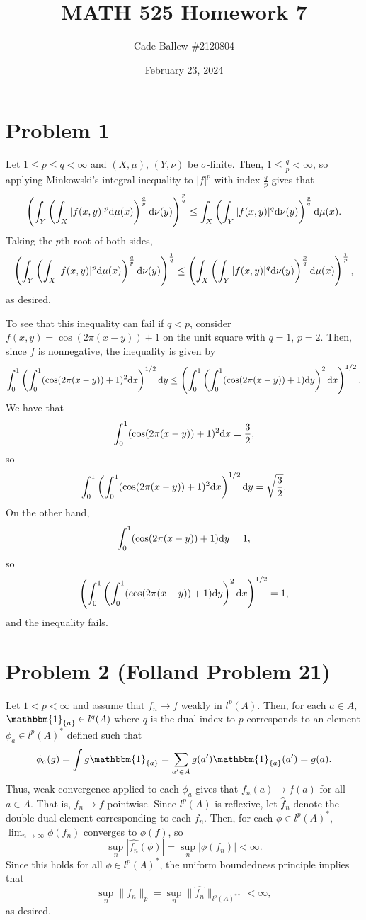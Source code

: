 \documentclass{article}
\title{MATH 525 Homework 7}
\author{Cade Ballew \#2120804}
\date{February 23, 2024}
\begin{document}
	
\maketitle
	
\section{Problem 1}
Let $1\leq p\leq q<\infty$ and $(X,\mu)$, $(Y,\nu)$ be $\sigma$-finite. Then, $1\leq \frac{q}{p}<\infty$, so applying Minkowski's integral inequality to $|f|^p$ with index $\frac{q}{p}$ gives that
\[
\left(\int_Y\left(\int_X|f(x, y)|^p \mathrm{d} \mu(x)\right)^{\frac{q}{p}} \mathrm{d} \nu(y)\right)^{\frac{p}{q}} \leq\int_X\left(\int_Y|f(x, y)|^q \mathrm{d} \nu(y)\right)^{\frac{p}{q}} \mathrm{d} \mu(x).
\]
Taking the $p$th root of both sides, 
$$
\left(\int_Y\left(\int_X|f(x, y)|^p \mathrm{d} \mu(x)\right)^{\frac{q}{p}} \mathrm{d} \nu(y)\right)^{\frac{1}{q}} \leq\left(\int_X\left(\int_Y|f(x, y)|^q \mathrm{d} \nu(y)\right)^{\frac{p}{q}} \mathrm{d} \mu(x)\right)^{\frac{1}{p}},
$$
as desired.

To see that this inequality can fail if $q<p$, consider $f(x,y)=\cos(2\pi(x-y))+1$ on the unit square with $q=1$, $p=2$. Then, since $f$ is nonnegative, the inequality is given by
\[
\int_0^1\left(\int_0^1(\cos(2\pi(x-y))+1)^2 \mathrm{d} x\right)^{1/2} \mathrm{d} y \leq\left(\int_0^1\left(\int_0^1(\cos(2\pi(x-y))+1) \mathrm{d} y\right)^{2} \mathrm{d} x\right)^{1/2}.
\]
We have that
\begin{align*}
\int_0^1(\cos(2\pi(x-y))+1)^2 \mathrm{d} x=\frac{3}{2},
\end{align*}
so
\[
\int_0^1\left(\int_0^1(\cos(2\pi(x-y))+1)^2 \mathrm{d} x\right)^{1/2} \mathrm{d} y=\sqrt{\frac{3}{2}}.
\]
On the other hand, 
\[
\int_0^1(\cos(2\pi(x-y))+1) \mathrm{d} y=1,
\]
so 
\[
\left(\int_0^1\left(\int_0^1(\cos(2\pi(x-y))+1) \mathrm{d} y\right)^{2} \mathrm{d} x\right)^{1/2}=1,
\]
and the inequality fails.

\section{Problem 2 (Folland Problem 21)}
Let $1<p<\infty$ and assume that $f_n\to f$ weakly in $l^p(A)$. Then, for each $a\in A$, $\mathbbm{1}_{\{a\}}\in l^q(A)$ where $q$ is the dual index to $p$ corresponds to an element $\phi_a\in l^p(A)^*$ defined such that
\[
\phi_a(g)=\int g\mathbbm{1}_{\{a\}}=\sum_{a'\in A}g(a')\mathbbm{1}_{\{a\}}(a')=g(a).
\]
Thus, weak convergence applied to each $\phi_a$ gives that $f_n(a)\to f(a)$ for all $a\in A$. That is, $f_n\to f$ pointwise. Since $l^p(A)$ is reflexive, let $\hat f_n$ denote the double dual element corresponding to each $f_n$. Then, for each $\phi\in l^p(A)^*$, $\lim_{n\to\infty}\phi(f_n)$ converges to $\phi(f)$, so
\[
\sup_n|\hat{f_n}(\phi)|=\sup_n|\phi(f_n)|<\infty.
\]
Since this holds for all $\phi\in l^p(A)^*$, the uniform boundedness principle implies that 
\[
\sup_n\|f_n\|_p=\sup_n\|\hat{f_n}\|_{l^p(A)^{**}}<\infty,
\]
as desired. 
\end{document}
